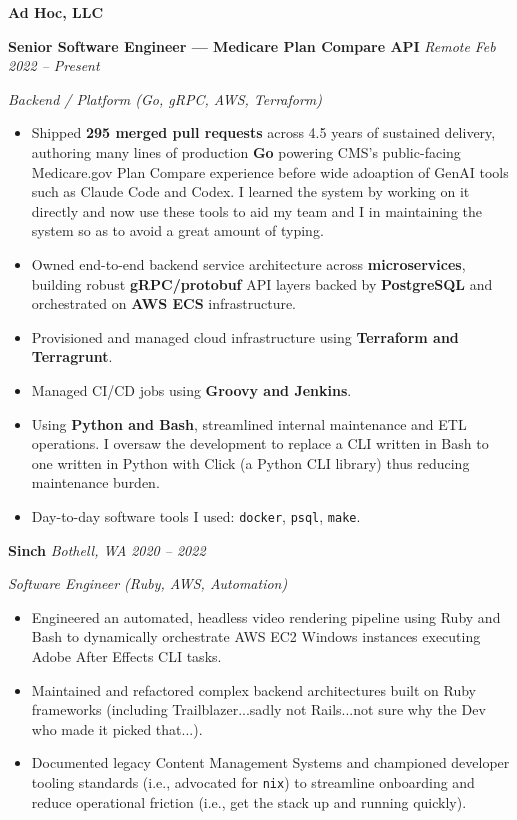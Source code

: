 \documentclass[10pt,letterpaper]{article}
\newcommand{\entry}[3]{%
  \noindent\textbf{\color{accentcolor}#1} \hfill \textit{#3} \quad \quad \textit{#2}\par
}
\newcommand{\role}[2]{%
  \noindent\textit{#1}\par
  \vspace{0.2em}
}
\begin{document}
\entry{Ad Hoc, LLC}{}{}
\entry{Senior Software Engineer --- Medicare Plan Compare API}{Feb 2022 -- Present}{Remote}
\role{Backend / Platform (Go, gRPC, AWS, Terraform)}{}
\begin{itemize}[leftmargin=1.2em, itemsep=0.25em]
        \item Shipped \textbf{295 merged pull requests} across 4.5 years of sustained delivery, authoring many lines of production \textbf{Go} powering CMS's public-facing Medicare.gov Plan Compare experience before wide adoaption of GenAI tools such as Claude Code and Codex. I learned the system by working on it directly and now use these tools to aid my team and I in maintaining the system so as to avoid a great amount of typing.
        \item Owned end-to-end backend service architecture across \textbf{microservices}, building robust \textbf{gRPC/protobuf} API layers backed by \textbf{PostgreSQL} and orchestrated on \textbf{AWS ECS} infrastructure.
  \item Provisioned and managed cloud infrastructure using \textbf{Terraform and Terragrunt}.
  \item Managed CI/CD jobs using \textbf{Groovy and Jenkins}.
  \item Using \textbf{Python and Bash}, streamlined internal maintenance and ETL operations. I oversaw the development to replace a CLI written in Bash to one written in Python with Click (a Python CLI library) thus reducing maintenance burden.
  \item Day-to-day software tools I used: \texttt{docker}, \texttt{psql}, \texttt{make}.
\end{itemize}

\entry{Sinch}{2020 -- 2022}{Bothell, WA}
\role{Software Engineer (Ruby, AWS, Automation)}{}
\begin{itemize}[leftmargin=1.2em, itemsep=0.25em]
  \item Engineered an automated, headless video rendering pipeline using Ruby and Bash to dynamically orchestrate AWS EC2 Windows instances executing Adobe After Effects CLI tasks.
  \item Maintained and refactored complex backend architectures built on Ruby frameworks (including Trailblazer...sadly not Rails...not sure why the Dev who made it picked that...).
  \item Documented legacy Content Management Systems and championed developer tooling standards (i.e., advocated for \texttt{nix}) to streamline onboarding and reduce operational friction (i.e., get the stack up and running quickly).
\end{itemize}
\end{document}
